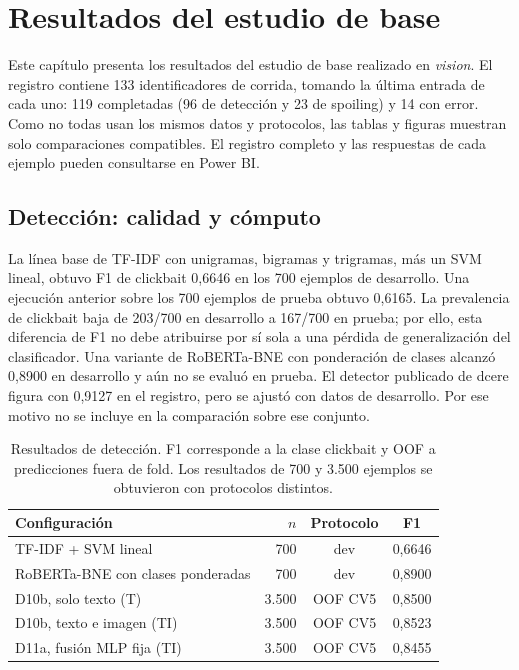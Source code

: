 \chapter{Resultados del estudio de base}
\label{cap:resultados}

Este capítulo presenta los resultados del estudio de base realizado en \emph{vision}.
El registro contiene 133 identificadores de corrida, tomando la última
entrada de cada uno: 119 completadas (96 de detección y 23 de
spoiling) y 14 con error. Como no todas usan los mismos datos y protocolos,
las tablas y figuras muestran solo comparaciones compatibles. El registro
completo y las respuestas de cada ejemplo pueden consultarse en Power BI.

\section{Detección: calidad y cómputo}

La línea base de TF-IDF con unigramas, bigramas y trigramas, más un SVM
lineal, obtuvo F1 de clickbait 0,6646 en los 700 ejemplos de desarrollo.
Una ejecución anterior sobre los 700 ejemplos de prueba obtuvo 0,6165.
La prevalencia de clickbait baja de 203/700 en desarrollo a 167/700 en
prueba; por ello, esta diferencia de F1 no debe atribuirse por sí sola
a una pérdida de generalización del clasificador.
Una variante de RoBERTa-BNE con ponderación de clases alcanzó 0,8900 en
desarrollo y aún no se evaluó en prueba. El detector publicado de dcere
figura con 0,9127 en el registro, pero se ajustó con datos de desarrollo.
Por ese motivo no se incluye en la comparación sobre ese conjunto.

\begin{table}[htbp]
\centering
\caption{Resultados de detección. F1 corresponde a la clase clickbait y OOF
a predicciones fuera de fold. Los resultados de 700 y 3.500 ejemplos se
obtuvieron con protocolos distintos.}
\label{tab:det-resultados}
\begin{tabular}{p{7.2cm}rcc}
\toprule
Configuración & $n$ & Protocolo & F1 \\
\midrule
TF-IDF + SVM lineal & 700 & dev & 0,6646 \\
RoBERTa-BNE con clases ponderadas & 700 & dev & 0,8900 \\
D10b, solo texto (T) & 3.500 & OOF CV5 & 0,8500 \\
D10b, texto e imagen (TI) & 3.500 & OOF CV5 & 0,8523 \\
D11a, fusión MLP fija (TI) & 3.500 & OOF CV5 & 0,8455 \\
\bottomrule
\end{tabular}
\end{table}

